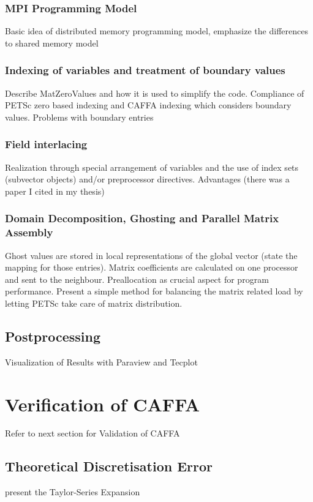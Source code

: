 \documentclass[article,type=msc,colorback,accentcolor=tud2a]{tudthesis}
\begin{document}
      \subsubsection{MPI Programming Model}
        Basic idea of distributed memory programming model, emphasize the differences to shared memory model
      \subsubsection{Indexing of variables and treatment of boundary values}
      Describe MatZeroValues and how it is used to simplify the code. Compliance of PETSc zero based indexing and CAFFA indexing which considers boundary values. Problems with boundary entries
      \subsubsection{Field interlacing}
      Realization through special arrangement of variables and the use of index sets (subvector objects) and/or preprocessor directives. Advantages (there was a paper I cited in my thesis)
      \subsubsection{Domain Decomposition, Ghosting and Parallel Matrix Assembly}

        Ghost values are stored in local representations of the global vector (state the mapping for those entries). Matrix coefficients are calculated on one processor and sent to the neighbour. Preallocation as crucial aspect for program performance. Present a simple method for balancing the matrix related load by letting PETSc take care of matrix distribution.

    \subsection{Postprocessing}
    
      Visualization of Results with Paraview and Tecplot

  \section{Verification of CAFFA}
    
    Refer to next section for Validation of CAFFA

    \subsection{Theoretical Discretisation Error}
      present the Taylor-Series Expansion
\end{document}
